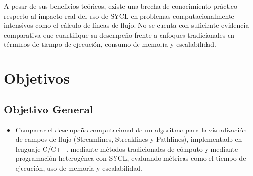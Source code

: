 \documentclass[12pt]{article}
\begin{document}
A pesar de sus beneficios teóricos, existe una brecha de conocimiento práctico respecto al impacto real del uso de SYCL en problemas computacionalmente intensivos como el cálculo de líneas de flujo. No se cuenta con suficiente evidencia comparativa que cuantifique su desempeño frente a enfoques tradicionales en términos de tiempo de ejecución, consumo de memoria y escalabilidad.

\section{Objetivos}
\subsection{Objetivo General}
\begin{itemize}

	\item Comparar el desempeño computacional de un algoritmo para la visualización de campos de flujo (Streamlines, Streaklines y Pathlines), implementado en lenguaje C/C++, mediante métodos tradicionales de cómputo y mediante programación heterogénea con SYCL, evaluando métricas como el tiempo de ejecución, uso de memoria y escalabilidad.
\end{itemize}
\end{document}
